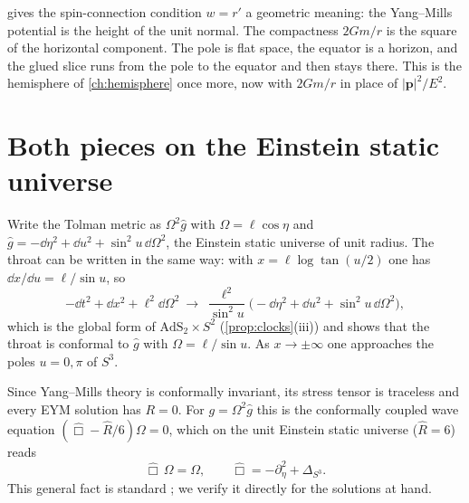  gives the spin-connection condition $w=r'$ a geometric meaning: the Yang--Mills potential is the height of the unit normal. The compactness $2Gm/r$ is the square of the horizontal component. The pole is flat space, the equator is a horizon, and the glued slice runs from the pole to the equator and then stays there. This is the hemisphere of \cref{ch:hemisphere} once more, now with $2Gm/r$ in place of $|\mathbf p|^2/E^2$.

\section{Both pieces on the Einstein static universe}

Write the Tolman metric as $\Omega^2\hat g$ with $\Omega=\ell\cos\eta$ and $\hat g=-\dd\eta^2+\dd u^2+\sin^2u\,\dd\Omega^2$, the Einstein static universe of unit radius. The throat can be written in the same way: with $x=\ell\log\tan(u/2)$ one has $\dd x/\dd u=\ell/\sin u$, so
\[
-\dd t^2+\dd x^2+\ell^2\dd\Omega^2\ \to\ \frac{\ell^2}{\sin^2u}\bigl(-\dd\eta^2+\dd u^2+\sin^2u\,\dd\Omega^2\bigr),
\]
which is the global form of $\mathrm{AdS}_2\times S^2$ (\cref{prop:clocks}(iii)) and shows that the throat is conformal to $\hat g$ with $\Omega=\ell/\sin u$. As $x\to\pm\infty$ one approaches the poles $u=0,\pi$ of $S^3$.

Since Yang--Mills theory is conformally invariant, its stress tensor is traceless and every EYM solution has $R=0$. For $g=\Omega^2\hat g$ this is the conformally coupled wave equation $(\hat\Box-\hat R/6)\Omega=0$, which on the unit Einstein static universe ($\hat R=6$) reads
\begin{equation}\label{eq:confwave}
\hat\Box\,\Omega=\Omega,\qquad \hat\Box=-\partial_\eta^2+\Delta_{S^3}.
\end{equation}
This general fact is standard \ext; we verify it directly for the solutions at hand.


